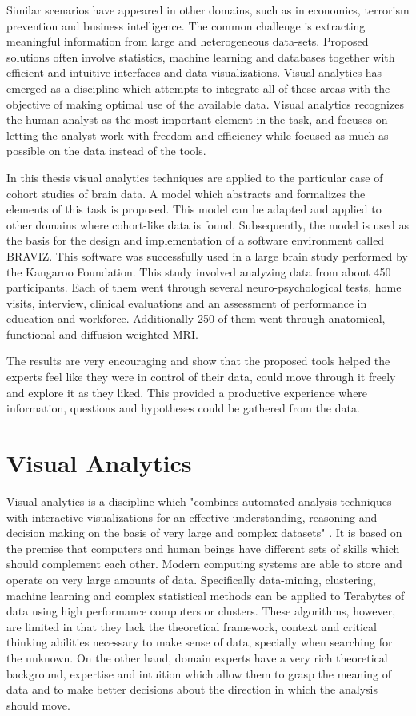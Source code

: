 Similar scenarios have appeared in other domains, such as in economics, terrorism prevention and business intelligence. The common challenge is extracting meaningful information from large and heterogeneous data-sets. Proposed solutions often involve statistics, machine learning and databases together with efficient and intuitive interfaces and data visualizations. Visual analytics has emerged as a discipline which attempts to integrate all of these areas with the objective of making optimal use of the available data. Visual analytics recognizes the human analyst as the most important element in the task, and focuses on letting the analyst work with freedom and efficiency while focused as much as possible on the data instead of the tools.

In this thesis visual analytics techniques are applied to the particular case of cohort studies of brain data. A model which abstracts and formalizes the elements of this task is proposed. This model can be adapted and applied to other domains where cohort-like data is found. Subsequently, the model is used as the basis for the design and implementation of a software environment called BRAVIZ. This software was successfully used in a large brain study performed by the Kangaroo Foundation. This study involved analyzing data from about 450 participants. Each of them went through several neuro-psychological tests, home visits, interview, clinical evaluations and an assessment of performance in education and workforce. Additionally 250 of them went through anatomical, functional and diffusion weighted MRI.

The results are very encouraging and show that the proposed tools  helped the experts feel like they were in control of their data, could move through it freely and explore it as they liked. This provided a productive experience where information, questions and hypotheses could be gathered from the data.


\section{Visual Analytics}


Visual analytics is a discipline which "combines automated analysis techniques with interactive
visualizations for an effective understanding, reasoning and decision making on the basis of very
large and complex datasets" \autocite{cook_illuminating_2005}. It is based on the premise that computers and
human beings have different sets of skills which should complement each other. Modern
computing systems are able to store and operate on very large amounts of data.
Specifically data-mining, clustering, machine learning and complex statistical methods can be
applied to Terabytes of data using high performance computers or clusters. These
algorithms, however, are limited in that they lack the theoretical framework, context and critical
thinking abilities necessary to make sense of data, specially when searching for the unknown.
On the other hand, domain experts have a very rich theoretical
background, expertise and intuition which allow them to grasp the meaning of data and to
make better decisions about the direction in which the analysis should move.

